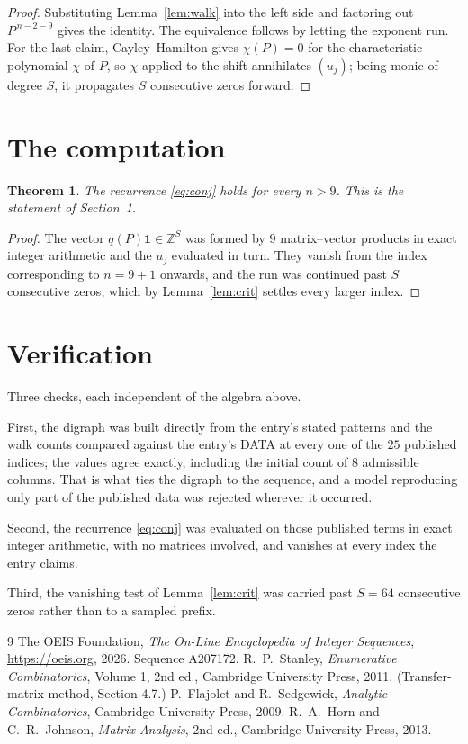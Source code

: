 \documentclass[11pt,a4paper]{article}
\theoremstyle{plain}
\newtheorem{theorem}{Theorem}
\theoremstyle{definition}
\begin{document}
\begin{proof}
Substituting Lemma~\ref{lem:walk} into the left side and factoring out
$P^{\,n-2-9}$ gives the identity. The equivalence follows by letting the exponent
run. For the last claim, Cayley--Hamilton gives $\chi(P)=0$ for the characteristic
polynomial $\chi$ of $P$, so $\chi$ applied to the shift annihilates $(u_j)$; being monic of
degree $S$, it propagates $S$ consecutive zeros forward.
\end{proof}

\section{The computation}

\begin{theorem}
The recurrence \eqref{eq:conj} holds for every $n>9$. This is the statement of
Section~1.
\end{theorem}

\begin{proof}
The vector $q(P)\mathbf{1}\in\mathbb{Z}^{S}$ was formed by $9$ matrix--vector
products in exact integer arithmetic and the $u_j$ evaluated in turn. They vanish from the
index corresponding to $n=9+1$ onwards, and the run was continued past $S$ consecutive
zeros, which by Lemma~\ref{lem:crit} settles every larger index.
\end{proof}

\section{Verification}

Three checks, each independent of the algebra above.

First, the digraph was built directly from the entry's stated patterns and the walk counts
compared against the entry's DATA at every one of the $25$ published indices; the
values agree exactly, including the initial count of $8$ admissible columns. That is
what ties the digraph to the sequence, and a model reproducing only part of the published
data was rejected wherever it occurred.

Second, the recurrence \eqref{eq:conj} was evaluated on those published terms in exact
integer arithmetic, with no matrices involved, and vanishes at every index the entry claims.

Third, the vanishing test of Lemma~\ref{lem:crit} was carried past $S=64$ consecutive
zeros rather than to a sampled prefix.

\begin{thebibliography}{9}
 The OEIS Foundation, \emph{The On-Line Encyclopedia of Integer
Sequences}, \url{https://oeis.org}, 2026. Sequence A207172.
 R.~P.~Stanley, \emph{Enumerative Combinatorics}, Volume 1, 2nd ed.,
Cambridge University Press, 2011. (Transfer-matrix method, Section 4.7.)
 P.~Flajolet and R.~Sedgewick, \emph{Analytic Combinatorics}, Cambridge
University Press, 2009.
 R.~A.~Horn and C.~R.~Johnson, \emph{Matrix Analysis}, 2nd ed., Cambridge
University Press, 2013.
\end{thebibliography}
\end{document}
